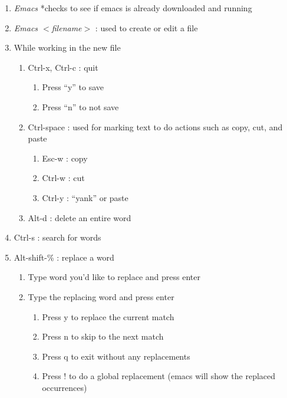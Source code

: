 \documentclass{article} %
\begin{document}
\noindent 

\begin{enumerate}
\item  \textit{Emacs} *checks to see if emacs is already downloaded and running

\item  \textit{Emacs $<$filename$>$} : used to create or edit a file

\item  While working in the new file

\begin{enumerate}
\item  Ctrl-x, Ctrl-c : quit

\begin{enumerate}
\item  Press ``y'' to save

\item  Press ``n'' to not save
\end{enumerate}

\item  Ctrl-space : used for marking text to do actions such as copy, cut, and paste

\begin{enumerate}
\item  Esc-w : copy

\item  Ctrl-w : cut

\item  Ctrl-y : ``yank'' or paste
\end{enumerate}

\item  Alt-d : delete an entire word
\end{enumerate}

\item  Ctrl-s : search for words

\item  Alt-shift-\% : replace a word

\begin{enumerate}
\item  Type word you'd like to replace and press enter

\item  Type the replacing word and press enter

\begin{enumerate}
\item  Press y to replace the current match

\item  Press n to skip to the next match

\item  Press q to exit without any replacements

\item  Press ! to do a global replacement (emacs will show the replaced occurrences)
\end{enumerate}
\end{enumerate}
\end{enumerate}
\end{document}
